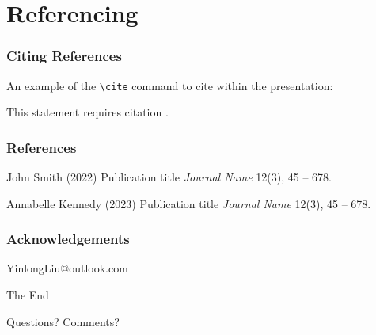 \documentclass[
	9pt, %
	fontset=none,
]{beamer}
\begin{document}
\section{Referencing}

\begin{frame}
	\frametitle{Citing References}
	
	An example of the \texttt{\textbackslash cite} command to cite within the presentation:
	
	\bigskip %
	
	This statement requires citation \cite{p1,p2}.
\end{frame}


\begin{frame} %
	\frametitle{References}
	
	\begin{thebibliography}{99} %
		\footnotesize %
		
			John Smith (2022)
			\newblock Publication title
			\newblock \emph{Journal Name} 12(3), 45 -- 678.
			
			Annabelle Kennedy (2023)
			\newblock Publication title
			\newblock \emph{Journal Name} 12(3), 45 -- 678.
	\end{thebibliography}
\end{frame}


\begin{frame}
	\frametitle{Acknowledgements}
	
YinlongLiu@outlook.com
\end{frame}


\begin{frame}%
	\begin{center}
		{\Huge The End}
		
		\bigskip\bigskip %
		
		{\LARGE Questions? Comments?}
	\end{center}
\end{frame}

\end{document}
